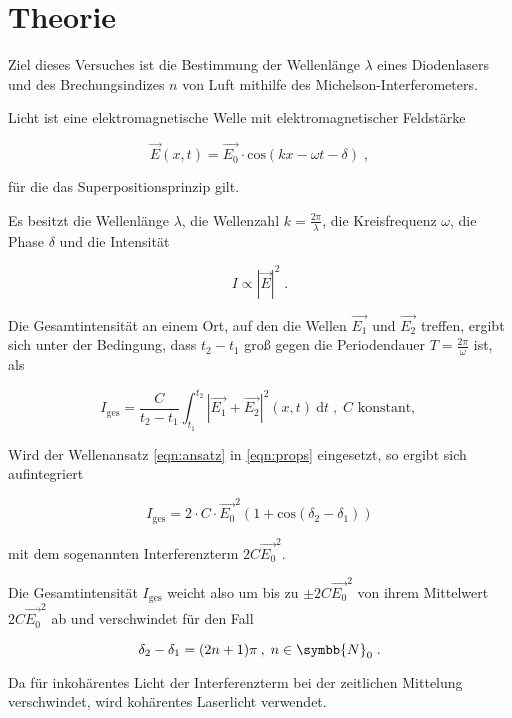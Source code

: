 \section{Theorie}

Ziel dieses Versuches ist die Bestimmung der Wellenlänge $\lambda$ eines Diodenlasers und
des Brechungsindizes $n$ von Luft mithilfe des Michelson-Interferometers.

Licht ist eine elektromagnetische Welle mit elektromagnetischer Feldstärke

\begin{equation}
    \vec{E}(x, t) = \vec{E_0} \cdot \text{cos}(kx - \omega t - \delta) \; ,
    \label{eqn:ansatz}
\end{equation}

für die das Superpositionsprinzip gilt.

Es besitzt die Wellenlänge $\lambda$, die Wellenzahl $k = \frac{2 \pi}{\lambda}$, die Kreisfrequenz $\omega$,
die Phase $\delta$ und die Intensität

\begin{equation}
    I \propto |\vec{E}|^2 \; .
    \label{eqn:props}
\end{equation}

Die Gesamtintensität an einem Ort, auf den die Wellen $\vec{E_1}$ und $\vec{E_2}$ treffen, ergibt sich 
unter der Bedingung, dass $t_2 - t_1$ groß gegen die Periodendauer $T = \frac{2 \pi}{\omega}$ ist, als

\begin{equation}
    I_\text{ges} = \frac{C}{t_2 - t_1} \int^{t_2}_{t_1} |\vec{E_1} + \vec{E_2}|^2 (x, t) \: \text{d}t 
    \; , \; C \text{ konstant, } 
\end{equation}

Wird der Wellenansatz \eqref{eqn:ansatz} in \eqref{eqn:props} eingesetzt, so ergibt sich aufintegriert

\begin{equation}
    I_\text{ges} = 2 \cdot C \cdot \vec{E_0}^2 (1 + \text{cos}(\delta_2 - \delta_1))
\end{equation}

mit dem sogenannten Interferenzterm $2 C \vec{E_0}^2$.

Die Gesamtintensität $I_\text{ges}$ weicht also um bis zu $\pm 2 C \vec{E_0}^2$ von ihrem Mittelwert
$2 C \vec{E_0}^2$ ab und verschwindet für den Fall

\begin{equation}
    \delta_2 - \delta_1 = (2n + 1)\pi \: , \; n \in \symbb{N}_0 \; .
\end{equation}

Da für inkohärentes Licht der Interferenzterm bei der zeitlichen Mittelung verschwindet, wird kohärentes
Laserlicht verwendet.

